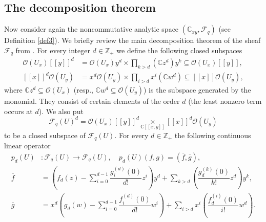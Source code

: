\documentclass[12pt,reqno]{amsart}%
\theoremstyle{plain}
\numberwithin{theorem}{section} \numberwithin{equation}{section}
\numberwithin{lemma}{section}
\numberwithin{remark}{section}
\numberwithin{example}{section}
\numberwithin{proposition}{section}
\numberwithin{definition}{section}
\numberwithin{corollary}{section}
\begin{document}
\subsection{The decomposition theorem}

Now consider again the noncommutative analytic space $\left(  \mathbb{C}%
_{xy},\mathcal{F}_{q}\right)  $ (see Definition \ref{def3}). We briefly review
the main decomposition theorem of the sheaf $\mathcal{F}_{q}$ from
\cite{Dosi25}. For every integer $d\in\mathbb{Z}_{+}$ we define the following
closed subspaces
\begin{align*}
\mathcal{O}\left(  U_{x}\right)  \left[  \left[  y\right]  \right]  ^{d}  &
=\mathcal{O}\left(  U_{x}\right)  y^{d}\times\prod\limits_{k>d}\left(
\mathbb{C}z^{d}\right)  y^{k}\subseteq\mathcal{O}\left(  U_{x}\right)  \left[
\left[  y\right]  \right]  \text{,}\\
\left[  \left[  x\right]  \right]  ^{d}\mathcal{O}\left(  U_{y}\right)   &
=x^{d}\mathcal{O}\left(  U_{y}\right)  \times\prod\limits_{i>d}x^{i}\left(
\mathbb{C}w^{d}\right)  \subseteq\left[  \left[  x\right]  \right]
\mathcal{O}\left(  U_{y}\right)  ,
\end{align*}
where $\mathbb{C}z^{d}\subseteq\mathcal{O}\left(  U_{x}\right)  $ (resp.,
$\mathbb{C}w^{d}\subseteq\mathcal{O}\left(  U_{y}\right)  $) is the subspace
generated by the monomial. They consist of certain elements of the order $d$
(the least nonzero term occurs at $d$). We also put
\[
\mathcal{F}_{q}\left(  U\right)  ^{d}=\mathcal{O}\left(  U_{x}\right)  \left[
\left[  y\right]  \right]  ^{d}\underset{\mathbb{C}\left[  \left[  x,y\right]
\right]  }{\times}\left[  \left[  x\right]  \right]  ^{d}\mathcal{O}\left(
U_{y}\right)
\]
to be a closed subspace of $\mathcal{F}_{q}\left(  U\right)  $. For every
$d\in\mathbb{Z}_{+}$ the following continuous linear operator
\begin{align*}
p_{d}\left(  U\right)   &  :\mathcal{F}_{q}\left(  U\right)  \rightarrow
\mathcal{F}_{q}\left(  U\right)  ,\quad p_{d}\left(  U\right)  \left(
f,g\right)  =\left(  \overline{f},\overline{g}\right)  ,\\
\overline{f}  &  =\left(  f_{d}\left(  z\right)  -\sum_{i=0}^{d-1}\dfrac
{g_{i}^{\left(  d\right)  }\left(  0\right)  }{d!}z^{i}\right)  y^{d}%
+\sum_{k>d}\left(  \dfrac{g_{d}^{\left(  k\right)  }\left(  0\right)  }%
{k!}z^{d}\right)  y^{k},\\
\overline{g}  &  =x^{d}\left(  g_{d}\left(  w\right)  -\sum_{i=0}^{d-1}%
\dfrac{f_{i}^{\left(  d\right)  }\left(  0\right)  }{d!}w^{i}\right)
+\sum_{i>d}x^{i}\left(  \dfrac{f_{d}^{\left(  i\right)  }\left(  0\right)
}{i!}w^{d}\right)  .
\end{align*}
\end{document}

